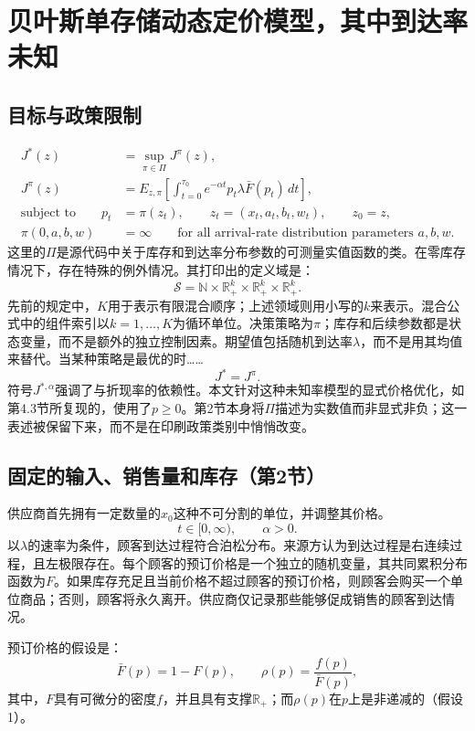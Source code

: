 \documentclass{article}
\begin{document}
\section*{贝叶斯单存储动态定价模型，其中到达率未知}

\subsection*{目标与政策限制}
\begin{align*}
J^*(z)&=\sup_{\pi\in\Pi}J^\pi(z),\\
J^\pi(z)&=E_{z,\pi}\left[\int_{t=0}^{\tau_0}e^{-\alpha t}p_t\lambda\bar F(p_t)\,dt\right],\\
\text{subject to}\qquad
p_t&=\pi(z_t),\qquad z_t=(x_t,a_t,b_t,w_t),\qquad z_0=z,\\
\pi(0,a,b,w)&=\infty\qquad\text{for all arrival-rate distribution parameters }a,b,w.
\end{align*}
这里的\(\Pi\)是源代码中关于库存和到达率分布参数的可测量实值函数的类。在零库存情况下，存在特殊的例外情况。其打印出的定义域是：
\[
\mathcal S=\mathbb N\times\mathbb R_+^k\times\mathbb R_+^k\times\mathbb R_+^k.
\]
先前的规定中，\(K\)用于表示有限混合顺序；上述领域则用小写的\(k\)来表示。混合公式中的组件索引以\(k=1,\ldots,K\)为循环单位。决策策略为\(\pi\)；库存和后续参数都是状态变量，而不是额外的独立控制因素。期望值包括随机到达率\(\lambda\)，而不是用其均值来替代。当某种策略是最优的时……
\[
J^*=J^\pi.
\]
符号\(J^{*,\alpha}\)强调了与折现率的依赖性。本文针对这种未知率模型的显式价格优化，如第4.3节所复现的，使用了\(p\geq0\)。第2节本身将\(\Pi\)描述为实数值而非显式非负；这一表述被保留下来，而不是在印刷政策类别中悄悄改变。

\subsection*{固定的输入、销售量和库存（第2节）}
供应商首先拥有一定数量的\(x_0\)这种不可分割的单位，并调整其价格。
\[
t\in[0,\infty),\qquad \alpha>0.
\]
以\(\lambda\)的速率为条件，顾客到达过程符合泊松分布。来源方认为到达过程是右连续过程，且左极限存在。每个顾客的预订价格是一个独立的随机变量，其共同累积分布函数为\(F\)。如果库存充足且当前价格不超过顾客的预订价格，则顾客会购买一个单位商品；否则，顾客将永久离开。供应商仅记录那些能够促成销售的顾客到达情况。

预订价格的假设是：
\[
\bar F(p)=1-F(p),\qquad
\rho(p)=\frac{f(p)}{\bar F(p)},
\]
其中，\(F\)具有可微分的密度\(f\)，并且具有支撑\(\mathbb R_+\)；而\(\rho(p)\)在\(p\)上是非递减的（假设1）。
\end{document}
